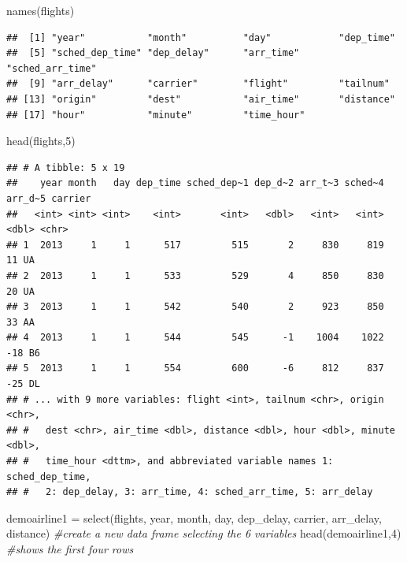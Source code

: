 \documentclass[
]{article}
\newenvironment{Shaded}{\begin{snugshade}}{\end{snugshade}}
\newcommand{\CommentTok}[1]{\textcolor[rgb]{0.56,0.35,0.01}{\textit{#1}}}
\newcommand{\DecValTok}[1]{\textcolor[rgb]{0.00,0.00,0.81}{#1}}
\newcommand{\FunctionTok}[1]{\textcolor[rgb]{0.00,0.00,0.00}{#1}}
\newcommand{\NormalTok}[1]{#1}
\newcommand{\OtherTok}[1]{\textcolor[rgb]{0.56,0.35,0.01}{#1}}
\begin{document}
\begin{Shaded}
\begin{Highlighting}[]
\FunctionTok{names}\NormalTok{(flights)}
\end{Highlighting}
\end{Shaded}

\begin{verbatim}
##  [1] "year"           "month"          "day"            "dep_time"      
##  [5] "sched_dep_time" "dep_delay"      "arr_time"       "sched_arr_time"
##  [9] "arr_delay"      "carrier"        "flight"         "tailnum"       
## [13] "origin"         "dest"           "air_time"       "distance"      
## [17] "hour"           "minute"         "time_hour"
\end{verbatim}

\begin{Shaded}
\begin{Highlighting}[]
\FunctionTok{head}\NormalTok{(flights,}\DecValTok{5}\NormalTok{)}
\end{Highlighting}
\end{Shaded}

\begin{verbatim}
## # A tibble: 5 x 19
##    year month   day dep_time sched_dep~1 dep_d~2 arr_t~3 sched~4 arr_d~5 carrier
##   <int> <int> <int>    <int>       <int>   <dbl>   <int>   <int>   <dbl> <chr>  
## 1  2013     1     1      517         515       2     830     819      11 UA     
## 2  2013     1     1      533         529       4     850     830      20 UA     
## 3  2013     1     1      542         540       2     923     850      33 AA     
## 4  2013     1     1      544         545      -1    1004    1022     -18 B6     
## 5  2013     1     1      554         600      -6     812     837     -25 DL     
## # ... with 9 more variables: flight <int>, tailnum <chr>, origin <chr>,
## #   dest <chr>, air_time <dbl>, distance <dbl>, hour <dbl>, minute <dbl>,
## #   time_hour <dttm>, and abbreviated variable names 1: sched_dep_time,
## #   2: dep_delay, 3: arr_time, 4: sched_arr_time, 5: arr_delay
\end{verbatim}

\begin{Shaded}
\begin{Highlighting}[]
\NormalTok{demoairline1 }\OtherTok{=} \FunctionTok{select}\NormalTok{(flights, year, month, day, dep\_delay, carrier, arr\_delay, distance)  }\CommentTok{\#create a new data frame selecting the 6 variables}
\FunctionTok{head}\NormalTok{(demoairline1,}\DecValTok{4}\NormalTok{) }\CommentTok{\#shows the first four rows}
\end{Highlighting}
\end{Shaded}
\end{document}
